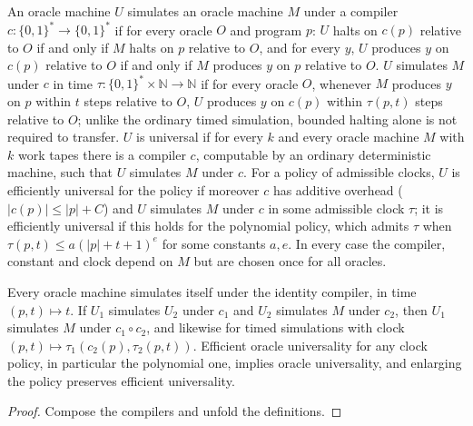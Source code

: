 \begin{definition}
  \label{def:barriers-oracle-universal}
  \leanok
  An oracle machine $U$ simulates an oracle machine $M$ under a compiler
  $c : \{0,1\}^* \to \{0,1\}^*$ if for every oracle $O$ and program $p$: $U$
  halts on $c(p)$ relative to $O$ if and only if $M$ halts on $p$ relative to
  $O$, and for every $y$, $U$ produces $y$ on $c(p)$ relative to $O$ if and
  only if $M$ produces $y$ on $p$ relative to $O$. $U$ simulates $M$ under $c$
  in time $\tau : \{0,1\}^* \times \mathbb{N} \to \mathbb{N}$ if for every
  oracle $O$, whenever $M$ produces $y$ on $p$ within $t$ steps relative to
  $O$, $U$ produces $y$ on $c(p)$ within $\tau(p, t)$ steps relative to $O$;
  unlike the ordinary timed simulation, bounded halting alone is not required
  to transfer. $U$ is universal if for every $k$ and every oracle machine $M$
  with $k$ work tapes there is a compiler $c$, computable by an ordinary
  deterministic machine, such that $U$ simulates $M$ under $c$. For a policy
  of admissible clocks, $U$ is efficiently universal for the policy if moreover
  $c$ has additive overhead ($|c(p)| \le |p| + C$) and $U$ simulates $M$ under
  $c$ in some admissible clock $\tau$; it is efficiently universal if this
  holds for the polynomial policy, which admits $\tau$ when
  $\tau(p, t) \le a (|p| + t + 1)^e$ for some constants $a, e$. In every case
  the compiler, constant and clock depend on $M$ but are chosen once for all
  oracles.
\end{definition}

\begin{lemma}
  \label{lem:barriers-oracle-universal-basic}
  \leanok
  Every oracle machine simulates itself under the identity compiler, in time
  $(p, t) \mapsto t$. If $U_1$ simulates $U_2$ under $c_1$ and $U_2$ simulates
  $M$ under $c_2$, then $U_1$ simulates $M$ under $c_1 \circ c_2$, and
  likewise for timed simulations with clock
  $(p, t) \mapsto \tau_1(c_2(p), \tau_2(p, t))$. Efficient oracle universality
  for any clock policy, in particular the polynomial one, implies oracle
  universality, and enlarging the policy preserves efficient universality.
\end{lemma}
\begin{proof}
  \leanok
  Compose the compilers and unfold the definitions.
\end{proof}

